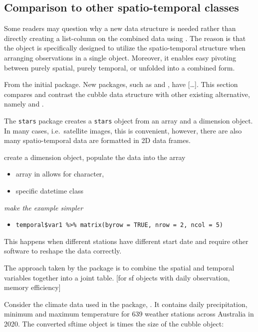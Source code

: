\documentclass[
  shortnames]{jss}
\providecommand{\tightlist}{%
  \setlength{\itemsep}{0pt}\setlength{\parskip}{0pt}}
\begin{document}
\hypertarget{tidyverse}{%
\subsection{Comparison to other spatio-temporal classes}\label{tidyverse}}

Some readers may question why a new data structure is needed rather than directly creating a list-column on the combined data using . The reason is that the  object is specifically designed to utilize the spatio-temporal structure when arranging observations in a single object. Moreover, it enables easy pivoting between purely spatial, purely temporal, or unfolded into a combined form.

From the initial  \citep{spacetime} package. New packages, such as  \citep{stars} and  \citep{sftime}, have {[}\ldots{]}. This section compares and contrast the cubble data structure with other existing alternative, namely  and .

The \texttt{stars} package creates a \texttt{stars} object from an array and a dimension object. In many cases, i.e.~satellite images, this is convenient, however, there are also many spatio-temporal data are formatted in 2D data frames.

create a dimension object, populate the data into the array

\begin{itemize}
\tightlist
\item
  array in  allows for character,
\item
  specific datetime class
\end{itemize}

\emph{make the example simpler}

\begin{itemize}
\tightlist
\item
  \texttt{temporal\$var1\ \%\textgreater{}\%\ matrix(byrow\ =\ TRUE,\ nrow\ =\ 2,\ ncol\ =\ 5)}
\end{itemize}

This happens when different stations have different start date and require other software to reshape the data correctly.

The approach taken by the  package is to combine the spatial and temporal variables together into a joint table. {[}for sf objects with daily observation, memory efficiency{]}

Consider the climate data used in the  package, . It contains daily precipitation, minimum and maximum temperature for 639 weather stations across Australia in 2020. The converted sftime object is times the size of the cubble object:
\end{document}
